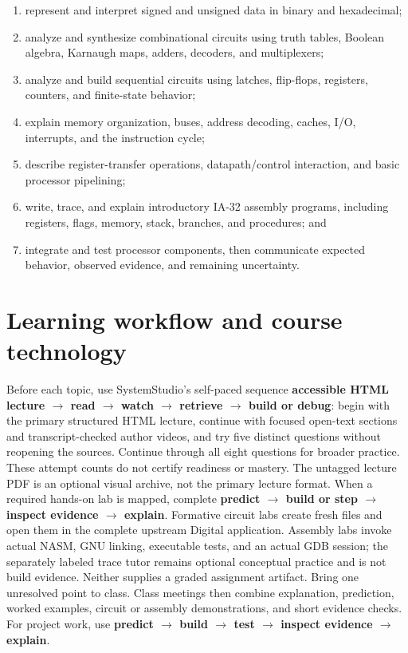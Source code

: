 \documentclass[10pt,letterpaper]{article}
\begin{document}
\begin{enumerate}
  \item represent and interpret signed and unsigned data in binary and hexadecimal;
  \item analyze and synthesize combinational circuits using truth tables, Boolean algebra, Karnaugh maps, adders, decoders, and multiplexers;
  \item analyze and build sequential circuits using latches, flip-flops, registers, counters, and finite-state behavior;
  \item explain memory organization, buses, address decoding, caches, I/O, interrupts, and the instruction cycle;
  \item describe register-transfer operations, datapath/control interaction, and basic processor pipelining;
  \item write, trace, and explain introductory IA-32 assembly programs, including registers, flags, memory, stack, branches, and procedures; and
  \item integrate and test processor components, then communicate expected behavior, observed evidence, and remaining uncertainty.
\end{enumerate}

\section{Learning workflow and course technology}

Before each topic, use SystemStudio's self-paced sequence \textbf{accessible HTML lecture $\rightarrow$ read $\rightarrow$ watch $\rightarrow$ retrieve $\rightarrow$ build or debug}: begin with the primary structured HTML lecture, continue with focused open-text sections and transcript-checked author videos, and try five distinct questions without reopening the sources. Continue through all eight questions for broader practice. These attempt counts do not certify readiness or mastery. The untagged lecture PDF is an optional visual archive, not the primary lecture format. When a required hands-on lab is mapped, complete \textbf{predict $\rightarrow$ build or step $\rightarrow$ inspect evidence $\rightarrow$ explain}. Formative circuit labs create fresh files and open them in the complete upstream Digital application. Assembly labs invoke actual NASM, GNU linking, executable tests, and an actual GDB session; the separately labeled trace tutor remains optional conceptual practice and is not build evidence. Neither supplies a graded assignment artifact. Bring one unresolved point to class. Class meetings then combine explanation, prediction, worked examples, circuit or assembly demonstrations, and short evidence checks. For project work, use \textbf{predict $\rightarrow$ build $\rightarrow$ test $\rightarrow$ inspect evidence $\rightarrow$ explain}.
\end{document}
